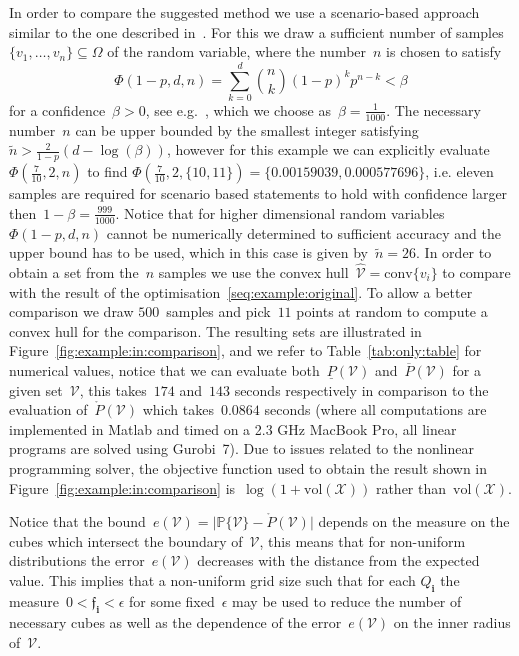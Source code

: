 \documentclass[letterpaper, 10pt, conference]{ieeeconf} %
\providecommand{\conv}{\text{conv}}
\providecommand{\bfa}[1]{\mathbf{#1}}
\begin{document}
%
In order to compare the suggested method we use a scenario-based approach similar to the one described in~\cite{Margellos:2014}.
%
For this we draw a sufficient number of samples~$\{v_1,\dots,v_n\}\subseteq\Omega$ of the random variable, where the number~$n$ is chosen to satisfy
\[
\Phi(1-p,d,n) = \sum_{k=0}^{d}\binom{n}{k}(1-p)^kp^{n-k}<\beta
\]
for a confidence~$\beta>0$, see e.g.~\cite{Calafiore:2010}, which we choose as~$\beta=\frac{1}{1000}$.
%
The necessary number~$n$ can be upper bounded by the smallest integer satisfying~$\tilde n>\frac{2}{1-p}(d-\log(\beta))$, however for this example we can explicitly evaluate~$\Phi(\frac{7}{10},2,n)$ to find $\Phi(\frac{7}{10},2,\{10,11\}) = \{0.00159039,0.000577696\}$, i.e. eleven samples are required for scenario based statements to hold with confidence larger then~$1-\beta=\frac{999}{1000}$.
%
Notice that for higher dimensional random variables~$\Phi(1-p,d,n)$ cannot be numerically determined to sufficient accuracy and the upper bound has to be used, which in this case is given by~$\tilde n=26$.
%
In order to obtain a set from the~$n$ samples we use the convex hull~$\hat{\mathcal V}=\conv\{v_i\}$ to compare with the result of the optimisation~\eqref{seq:example:original}.
%
To allow a better comparison we draw $500$~samples and pick~$11$ points at random to compute a convex hull for the comparison.
%
The resulting sets are illustrated in Figure~\ref{fig:example:in:comparison}, and we refer to Table~\ref{tab:only:table} for numerical values, notice that we can evaluate both~$\underline{P}(\mathcal V)$ and~$\overline{P}(\mathcal V)$ for a given set~$\mathcal V$, this takes~$174$ and~$143$ seconds respectively in comparison to the evaluation of~$\mathring{P}(\mathcal V)$ which takes~$0.0864$ seconds (where all computations are implemented in Matlab and timed on a 2.3 GHz MacBook Pro, all linear programs are solved using Gurobi~7).
%
Due to issues related to the nonlinear programming solver, the objective function used to obtain the result shown in Figure~\ref{fig:example:in:comparison} is~$\log(1+\text{vol}(\mathcal X))$ rather than~$\text{vol}(\mathcal X)$.
%


%
Notice that the bound~$e(\mathcal V) = \lvert\mathbb P\{\mathcal V\}-\mathring{P}(\mathcal V)\rvert$ depends on the measure on the cubes which intersect the boundary of~$\mathcal V$, this means that for non-uniform distributions the error~$e(\mathcal V)$ decreases with the distance from the expected value.
%
This implies that a non-uniform grid size such that for each $Q_\bfa{i}$ the measure~$0<\mathfrak{f}_\bfa{i}<\epsilon$ for some fixed~$\epsilon$ may be used to reduce the number of necessary cubes as well as the dependence of the error~$e(\mathcal V)$ on the inner radius of~$\mathcal V$.
\end{document}
